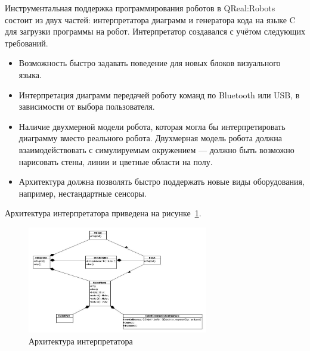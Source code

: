 \documentclass[a4paper]{article}
\begin{document}
Инструментальная поддержка программирования роботов в QReal:Robots состоит из двух частей: интерпретатора диаграмм и генератора кода на языке C для загрузки программы на робот. Интерпретатор создавался с учётом следующих требований.
\begin{itemize}
  \item Возможность быстро задавать поведение для новых блоков визуального языка.
  \item Интерпретация диаграмм передачей роботу команд по Bluetooth или USB, в зависимости от выбора пользователя.
  \item Наличие двухмерной модели робота, которая могла бы интерпретировать диаграмму вместо реального робота. Двухмерная модель робота должна взаимодействовать с симулируемым окружением --- должно быть возможно нарисовать стены, линии и цветные области на полу.
  \item Архитектура должна позволять быстро поддержать новые виды оборудования, например, нестандартные сенсоры.
\end{itemize}

Архитектура интерпретатора приведена на рисунке~\ref{interpreterArchitecture}.

\begin{figure} [ht]
  \begin{center}
    \includegraphics[width=0.7\textwidth]{interpreterArchitecture.jpg}
    \caption{Архитектура интерпретатора}
    \label{interpreterArchitecture}
  \end{center}
\end{figure}
\end{document}
